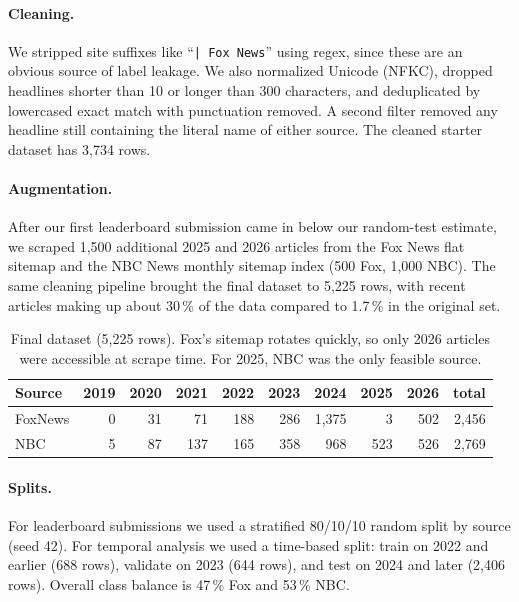 \documentclass[11pt]{article}
\begin{document}
\paragraph{Cleaning.}
We stripped site suffixes like ``\texttt{| Fox News}'' using regex, since these are an obvious source of label leakage. We also normalized Unicode (NFKC), dropped headlines shorter than 10 or longer than 300 characters, and deduplicated by lowercased exact match with punctuation removed. A second filter removed any headline still containing the literal name of either source. The cleaned starter dataset has 3,734 rows.

\paragraph{Augmentation.}
After our first leaderboard submission came in below our random-test estimate, we scraped 1,500 additional 2025 and 2026 articles from the Fox News flat sitemap and the NBC News monthly sitemap index (500 Fox, 1,000 NBC). The same cleaning pipeline brought the final dataset to 5,225 rows, with recent articles making up about 30\,\% of the data compared to 1.7\,\% in the original set.

\begin{table}[h]
\centering\small
\begin{tabular}{lrrrrrrrr|r}
\toprule
Source & 2019 & 2020 & 2021 & 2022 & 2023 & 2024 & 2025 & 2026 & total \\\midrule
FoxNews & 0 & 31 & 71 & 188 & 286 & 1{,}375 & 3 & 502 & 2{,}456 \\
NBC     & 5 & 87 & 137 & 165 & 358 & 968 & 523 & 526 & 2{,}769 \\\bottomrule
\end{tabular}
\caption{Final dataset (5,225 rows). Fox's sitemap rotates quickly, so only 2026 articles were accessible at scrape time. For 2025, NBC was the only feasible source.}
\label{tab:dataset}
\end{table}

\paragraph{Splits.}
For leaderboard submissions we used a stratified 80/10/10 random split by source (seed 42). For temporal analysis we used a time-based split: train on 2022 and earlier (688 rows), validate on 2023 (644 rows), and test on 2024 and later (2,406 rows). Overall class balance is 47\,\% Fox and 53\,\% NBC.
\end{document}
